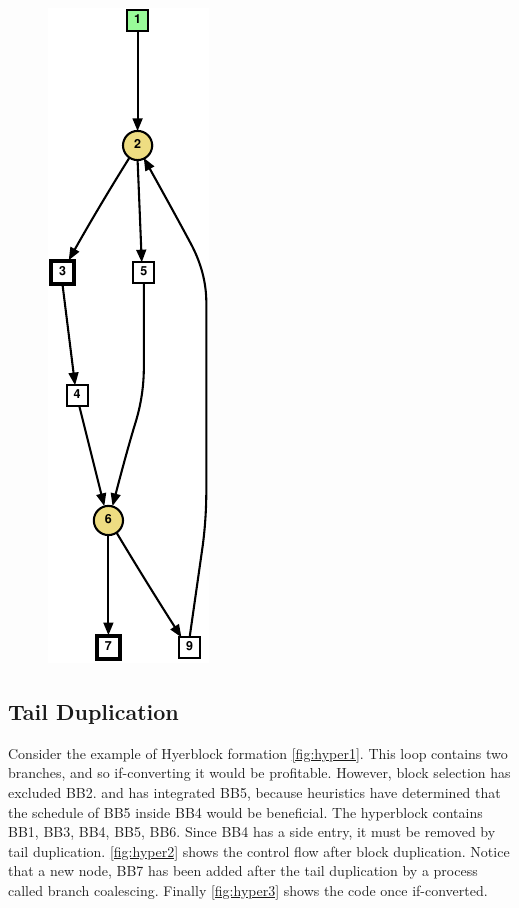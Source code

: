 \begin{figure}
{    \includegraphics[scale=0.6]{graph7}
    \label{fig:wc2}}
\label{fig:wc example}
\end{figure}

\subsection{Tail Duplication}

Consider the example of Hyerblock formation \ref{fig:hyper1}. This loop contains two branches, and so if-converting it would be profitable. However, block selection has excluded BB2. and has integrated BB5, because heuristics have determined that the schedule of BB5 inside BB4 would be beneficial. The hyperblock contains {BB1, BB3, BB4, BB5, BB6}. Since BB4 has a side entry, it must be removed by tail duplication. \ref{fig:hyper2} shows the control flow after block duplication. Notice that a new node, BB7 has been added after the tail duplication by a process called branch coalescing. Finally \ref{fig:hyper3} shows the code once if-converted.

